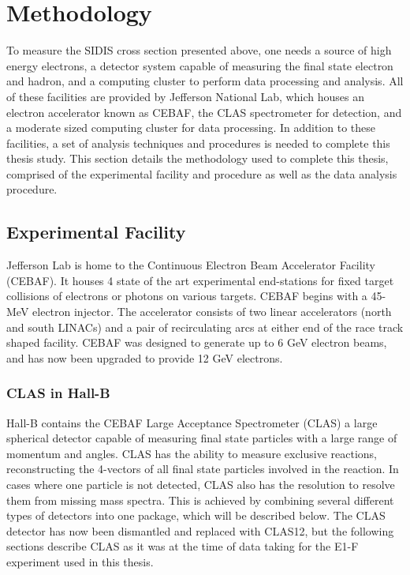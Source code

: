 
\section{Methodology}
To measure the SIDIS cross section presented above, one needs a source of high energy electrons, a detector system capable of measuring the final state electron and hadron, and a computing cluster to perform data processing and analysis.  All of these facilities are provided by Jefferson National Lab, which houses an electron accelerator known as CEBAF, the CLAS spectrometer for detection, and a moderate sized computing cluster for data processing.  In addition to these facilities, a set of analysis techniques and procedures is needed to complete this thesis study.  This section details the methodology used to complete this thesis, comprised of the experimental facility and procedure as well as the data analysis procedure.

\subsection{Experimental Facility}
Jefferson Lab is home to the Continuous Electron Beam Accelerator Facility (CEBAF).  It houses 4 state of the art experimental end-stations for fixed target collisions of electrons or photons on various targets.  CEBAF begins with a 45-MeV electron injector.  The accelerator consists of two linear accelerators (north and south LINACs) and a pair of recirculating arcs at either end of the race track shaped facility.  CEBAF was designed to generate up to 6 GeV electron beams, and has now been upgraded to provide 12 GeV electrons. 

\subsubsection{CLAS in Hall-B}
Hall-B contains the CEBAF Large Acceptance Spectrometer (CLAS) a large spherical detector capable of measuring final state particles with a large range of momentum and angles.  CLAS has the ability to measure exclusive reactions, reconstructing the 4-vectors of all final state particles involved in the reaction.  In cases where one particle is not detected, CLAS also has the resolution to resolve them from missing mass spectra.  This is achieved by combining several different types of detectors into one package, which will be described below.  The CLAS detector has now been dismantled and replaced with CLAS12, but the following sections describe CLAS as it was at the time of data taking for the E1-F experiment used in this thesis.\\

